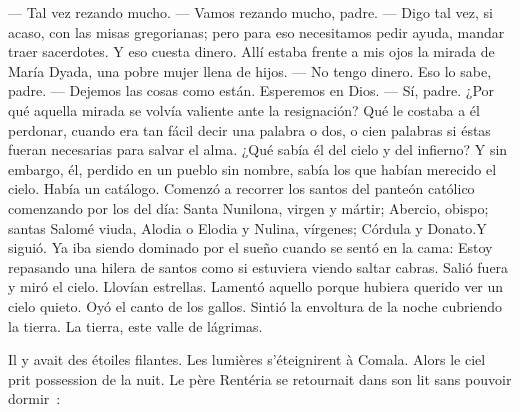 \begin{pages}
\begin{Leftside}
		\pend
		\pstart
			\guillemotright --- Tal vez rezando mucho.
		\pend
		\pstart
			\guillemotright --- Vamos rezando mucho, padre.
		\pend
		\pstart
			\guillemotright --- Digo tal vez, si acaso, con las misas gregorianas; pero para eso necesitamos pedir ayuda, mandar traer sacerdotes. Y eso cuesta dinero.
		\pend
		\pstart
			\guillemotright Allí estaba frente a mis ojos la mirada de María Dyada, una pobre mujer llena de hijos.
		\pend
		\pstart
			\guillemotright --- No tengo dinero. Eso lo sabe, padre.
		\pend
		\pstart
			\guillemotright --- Dejemos las cosas como están. Esperemos en Dios.
		\pend
		\pstart
			\guillemotright --- Sí, padre.\guillemotright
		\pend
		\pstart
			¿Por qué aquella mirada se volvía valiente ante la resignación? Qué le costaba a él perdonar, cuando era tan fácil decir una palabra o dos, o cien palabras si éstas fueran necesarias para salvar el alma. ¿Qué sabía él del cielo y del infierno? Y sin embargo, él, perdido en un pueblo sin nombre, sabía los que habían merecido el cielo. Había un catálogo. Comenzó a recorrer los santos del panteón católico comenzando por los del día: \guillemotleft Santa Nunilona, virgen y mártir; Abercio, obispo; santas Salomé viuda, Alodia o Elodia y Nulina, vírgenes; Córdula y Donato.\guillemotright Y siguió. Ya iba siendo dominado por el sueño cuando se sentó en la cama: \guillemotleft Estoy repasando una hilera de santos como si estuviera viendo saltar cabras.\guillemotright
		\pend
		\pstart
			Salió fuera y miró el cielo. Llovían estrellas. Lamentó aquello porque
			hubiera querido ver un cielo quieto. Oyó el canto de los gallos. Sintió la
			envoltura de la noche cubriendo la tierra. La tierra, \guillemotleft este valle de lágrimas\guillemotright.
		\pend
		\endnumbering
	\end{Leftside}
	\begin{Rightside}
		\beginnumbering
			Il y avait des étoiles filantes. Les lumières s'éteignirent à Comala.
		\pend
		\pstart
			Alors le ciel prit possession de la nuit.
		\pend
		\pstart
			Le père Rentéria se retournait dans son lit sans pouvoir dormir :


\end{Rightside}
\end{pages}
